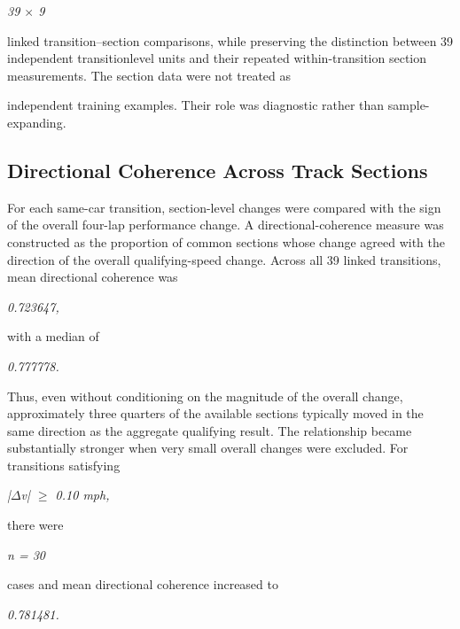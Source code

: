 \begin{center}\textit{39 \ensuremath{\times} 9}\end{center}

linked transition--section comparisons, while preserving the distinction between 39 independent transitionlevel units and their repeated within-transition section measurements. The section data were not treated as

independent training examples. Their role was diagnostic rather than sample-expanding.

\subsection{Directional Coherence Across Track Sections}
For each same-car transition, section-level changes were compared with the sign of the overall four-lap performance change. A directional-coherence measure was constructed as the proportion of common sections whose change agreed with the direction of the overall qualifying-speed change. Across all 39 linked transitions, mean directional coherence was

\begin{center}\textit{0.723647,}\end{center}

with a median of

\begin{center}\textit{0.777778.}\end{center}

Thus, even without conditioning on the magnitude of the overall change, approximately three quarters of the available sections typically moved in the same direction as the aggregate qualifying result. The relationship became substantially stronger when very small overall changes were excluded. For transitions satisfying

\begin{center}\textit{|\ensuremath{\Delta}v| \ensuremath{\ge} 0.10 mph,}\end{center}

there were

\begin{center}\textit{n = 30}\end{center}

cases and mean directional coherence increased to

\begin{center}\textit{0.781481.}\end{center}

